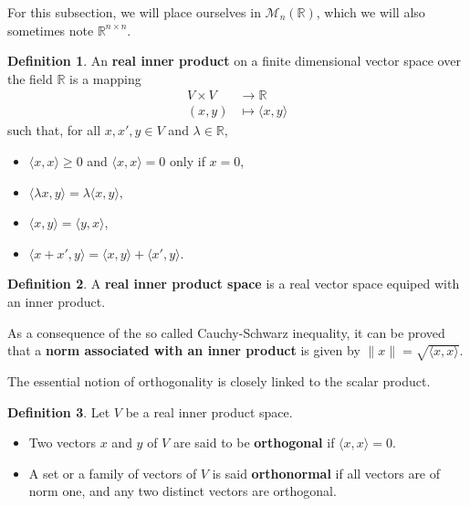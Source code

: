 \documentclass{report}
\theoremstyle{definition}
\newtheorem{defin}{Definition}
\theoremstyle{remark}
\begin{document}
For this subsection, we will place ourselves in $\mathcal{M}_{n}(\mathbb{R})$, which we will also sometimes note $\mathbb{R}^{n \times n}$.

\begin{defin}
        An \textbf{real inner product} on a finite dimensional vector space over the field $\mathbb{R}$ is a mapping
        \begin{equation*}
                \begin{split}
                        V \times V & \to \mathbb{R} \\
                        (x,y) &  \mapsto \langle x, y  \rangle 
                \end{split}
        \end{equation*}
        such that, for all $x,x',y \in V$ and $\lambda \in \mathbb{R}$,
        \begin{itemize}
                \item $ \langle x, x \rangle \geq 0 $  and $\langle x,x \rangle = 0$ only if $x = 0$,
                \item $ \langle \lambda x,y \rangle = \lambda \langle x,y \rangle,$
                \item $ \langle x,y \rangle = \langle y,x \rangle$,
                \item $ \langle x + x', y \rangle = \langle x,y\rangle + \langle x',y \rangle$.
        \end{itemize}
\end{defin}

\bigskip
\begin{defin}
        A \textbf{real inner product space} is a real vector space equiped with an inner product.
\end{defin}



As a consequence of the so called Cauchy-Schwarz inequality, it can be proved that a \textbf{norm associated with an inner product} is given by $\lVert x \rVert = \sqrt{\langle x,x \rangle}$.

The essential notion of orthogonality is closely linked to the scalar product. 

\begin{defin} Let $V$ be a real inner product space.
\begin{itemize}
    \item    Two vectors $x$ and $y$ of $V$ are said to be \textbf{orthogonal} if $\langle x,x \rangle = 0$.
    \item A set or a family of vectors of $V$ is said \textbf{orthonormal} if all vectors are of norm one, and any two distinct vectors are orthogonal.
\end{itemize}
\end{defin}
\end{document}
